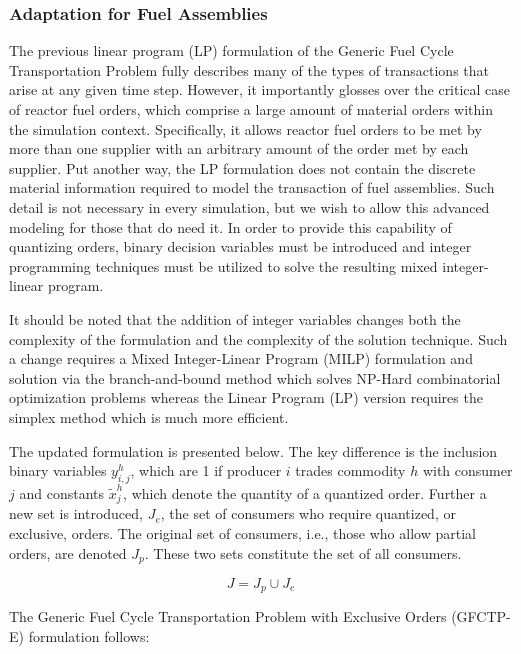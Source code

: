 \subsubsection{Adaptation for Fuel Assemblies}

The previous linear program (LP) formulation of the Generic Fuel Cycle
Transportation Problem fully describes many of the types of transactions that
arise at any given time step. However, it importantly glosses over the critical
case of reactor fuel orders, which comprise a large amount of material orders
within the simulation context. Specifically, it allows reactor fuel orders to be
met by more than one supplier with an arbitrary amount of the order met by each
supplier. Put another way, the LP formulation does not contain the discrete
material information required to model the transaction of fuel assemblies. Such
detail is not necessary in every simulation, but we wish to allow this advanced
modeling for those that do need it. In order to provide this capability of
quantizing orders, binary decision variables must be introduced and integer
programming techniques must be utilized to solve the resulting mixed
integer-linear program. 

It should be noted that the addition of integer variables changes both the
complexity of the formulation and the complexity of the solution technique. Such
a change requires a Mixed Integer-Linear Program (MILP) formulation and solution
via the branch-and-bound method which solves NP-Hard combinatorial optimization
problems whereas the Linear Program (LP) version requires the simplex method
which is much more efficient.

The updated formulation is presented below. The key difference is the inclusion
binary variables $y_{i,j}^{h}$, which are 1 if producer $i$ trades commodity $h$
with consumer $j$ and constants $\tilde{x}_{j}^{h}$, which denote the quantity
of a quantized order. Further a new set is introduced, $J_{e}$, the set of
consumers who require quantized, or exclusive, orders. The original set of
consumers, i.e., those who allow partial orders, are denoted $J_{p}$. These two
sets constitute the set of all consumers.

\begin{equation}\label{eqs:consumer-union}
  J = J_{p} \cup J_{e}
\end{equation}

The Generic Fuel Cycle Transportation Problem with Exclusive Orders (GFCTP-E)
formulation follows:

